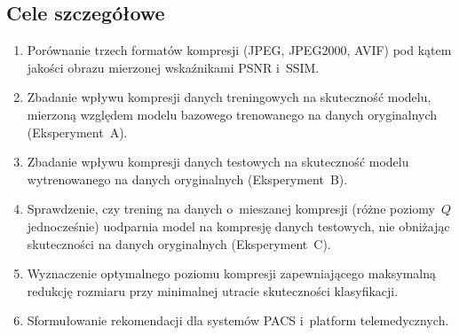 \documentclass[12pt,a4paper]{article}
\begin{document}
\subsection{Cele szczegółowe}
\begin{enumerate}
    \item Porównanie trzech formatów kompresji (JPEG, JPEG2000, AVIF) pod kątem jakości obrazu mierzonej wskaźnikami PSNR i~SSIM.
    \item Zbadanie wpływu kompresji danych treningowych na skuteczność modelu, mierzoną względem modelu bazowego trenowanego na danych oryginalnych (Eksperyment~A).
    \item Zbadanie wpływu kompresji danych testowych na skuteczność modelu wytrenowanego na danych oryginalnych (Eksperyment~B).
    \item Sprawdzenie, czy trening na danych o~mieszanej kompresji (różne poziomy~$Q$ jednocześnie) uodparnia model na kompresję danych testowych, nie obniżając skuteczności na danych oryginalnych (Eksperyment~C).
    \item Wyznaczenie optymalnego poziomu kompresji zapewniającego maksymalną redukcję rozmiaru przy minimalnej utracie skuteczności klasyfikacji.
    \item Sformułowanie rekomendacji dla systemów PACS i~platform telemedycznych.
\end{enumerate}
\end{document}
